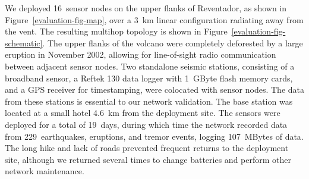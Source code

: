 We deployed 16~sensor nodes on the upper flanks of Reventador, as shown in
Figure~\ref{evaluation-fig-map}, over a 3~km linear configuration radiating
away from the vent. The resulting multihop topology is shown in
Figure~\ref{evaluation-fig-schematic}. The upper flanks of the volcano were
completely deforested by a large eruption in November 2002, allowing for
line-of-sight radio communication between adjacent sensor nodes.  Two
standalone seismic stations, consisting of a broadband sensor, a Reftek 130
data logger with 1~GByte flash memory cards, and a GPS receiver for
timestamping, were colocated with sensor nodes. The data from these stations
is essential to our network validation.
The base station was located at a small hotel 4.6~km from the deployment
site.  The sensors were deployed for a total of 19~days, during which time
the network recorded data from 229~earthquakes, eruptions, and tremor events,
logging 107~MBytes of data. The long hike and lack of roads prevented
frequent returns to the deployment site, although we returned several times
to change batteries and perform other network maintenance.



%
%
%

\clearpage
